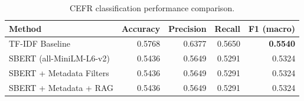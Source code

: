 \begin{table}[htbp]
\centering
\caption{CEFR classification performance comparison.}
\label{tab:classification_comparison}
\begin{tabular}{lrrrr}
\toprule
Method & Accuracy & Precision & Recall & F1 (macro) \\
\midrule
TF-IDF Baseline & 0.5768 & 0.6377 & 0.5650 & \textbf{0.5540} \\
SBERT (all-MiniLM-L6-v2) & 0.5436 & 0.5649 & 0.5291 & 0.5324 \\
SBERT + Metadata Filters & 0.5436 & 0.5649 & 0.5291 & 0.5324 \\
SBERT + Metadata + RAG & 0.5436 & 0.5649 & 0.5291 & 0.5324 \\
\bottomrule
\end{tabular}
\end{table}
